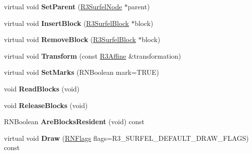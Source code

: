 \begin{DoxyCompactItemize}
\item 
virtual void {\bfseries Set\+Parent} (\hyperlink{class_r3_surfel_node}{R3\+Surfel\+Node} $\ast$parent)\hypertarget{class_r3_surfel_node_ae742da019ec915b07b5638f94394eea9}{}\label{class_r3_surfel_node_ae742da019ec915b07b5638f94394eea9}

\item 
virtual void {\bfseries Insert\+Block} (\hyperlink{class_r3_surfel_block}{R3\+Surfel\+Block} $\ast$block)\hypertarget{class_r3_surfel_node_ac5556452ed9efc56a147954d70a1a281}{}\label{class_r3_surfel_node_ac5556452ed9efc56a147954d70a1a281}

\item 
virtual void {\bfseries Remove\+Block} (\hyperlink{class_r3_surfel_block}{R3\+Surfel\+Block} $\ast$block)\hypertarget{class_r3_surfel_node_a09c99544c147d3b84d5bbce216a86b8b}{}\label{class_r3_surfel_node_a09c99544c147d3b84d5bbce216a86b8b}

\item 
virtual void {\bfseries Transform} (const \hyperlink{class_r3_affine}{R3\+Affine} \&transformation)\hypertarget{class_r3_surfel_node_a6c2c066b421082871876c7e362042058}{}\label{class_r3_surfel_node_a6c2c066b421082871876c7e362042058}

\item 
virtual void {\bfseries Set\+Marks} (R\+N\+Boolean mark=T\+R\+UE)\hypertarget{class_r3_surfel_node_ab94d3ebd34dffde247f5ab9592f3ec68}{}\label{class_r3_surfel_node_ab94d3ebd34dffde247f5ab9592f3ec68}

\item 
void {\bfseries Read\+Blocks} (void)\hypertarget{class_r3_surfel_node_a0d2385af7a9c74fb261335c06a940a16}{}\label{class_r3_surfel_node_a0d2385af7a9c74fb261335c06a940a16}

\item 
void {\bfseries Release\+Blocks} (void)\hypertarget{class_r3_surfel_node_a7efcbad6bd2a1490ea8ee256ef11fea3}{}\label{class_r3_surfel_node_a7efcbad6bd2a1490ea8ee256ef11fea3}

\item 
R\+N\+Boolean {\bfseries Are\+Blocks\+Resident} (void) const \hypertarget{class_r3_surfel_node_af2e7f08424a86c51014b317787d61b3f}{}\label{class_r3_surfel_node_af2e7f08424a86c51014b317787d61b3f}

\item 
virtual void {\bfseries Draw} (\hyperlink{class_r_n_flags}{R\+N\+Flags} flags=R3\+\_\+\+S\+U\+R\+F\+E\+L\+\_\+\+D\+E\+F\+A\+U\+L\+T\+\_\+\+D\+R\+A\+W\+\_\+\+F\+L\+A\+GS) const \hypertarget{class_r3_surfel_node_a26d9f74995f8a205108ae760bb55029f}{}\label{class_r3_surfel_node_a26d9f74995f8a205108ae760bb55029f}


\end{DoxyCompactItemize}

